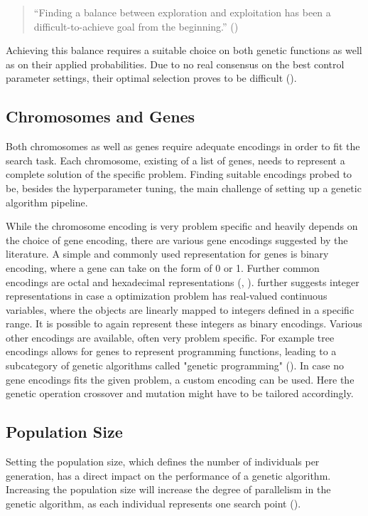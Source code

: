 \begin{quote}
	\begin{em}
		\enquote{Finding a balance between exploration and exploitation has been a difficult-to-achieve goal from the beginning.} (\cite{kacprzyk_parameter_2007})
	\end{em}
\end{quote}

Achieving this balance requires a suitable choice on both genetic functions as well as on their applied probabilities. Due to no real consensus on the best control parameter settings, their optimal selection proves to be difficult (\cite{kacprzyk_parameter_2007}).

\subsection{Chromosomes and Genes}
\label{sect:foundations:chromosomes_and_genes}
Both chromosomes as well as genes require adequate encodings in order to fit the search task. Each chromosome, existing of a list of genes, needs to represent a complete solution of the specific problem. Finding suitable encodings probed to be, besides the hyperparameter tuning, the main challenge of setting up a genetic algorithm pipeline.

While the chromosome encoding is very problem specific and heavily depends on the choice of gene encoding, there are various gene encodings suggested by the literature. A simple and commonly used representation for genes is binary encoding, where a gene can take on the form of 0 or 1. Further common encodings are octal and hexadecimal representations (\cite{srinivas_genetic_1994}, \cite{katoch_review_2021}). \cite{srinivas_genetic_1994} further suggests integer representations in case a optimization problem has real-valued continuous variables, where the objects are linearly mapped to integers defined in a specific range. It is possible to again represent these integers as binary encodings. Various other encodings are available, often very problem specific. For example tree encodings allows for genes to represent programming functions, leading to a subcategory of genetic algorithms called "genetic programming" (\cite{katoch_review_2021}). In case no gene encodings fits the given problem, a custom encoding can be used. Here the genetic operation crossover and mutation might have to be tailored accordingly. 

\subsection{Population Size}
Setting the population size, which defines the number of individuals per generation, has a direct impact on the performance of a genetic algorithm. Increasing the population size will increase the degree of parallelism in the genetic algorithm, as each individual represents one search point (\cite{mills_determining_2015}).

